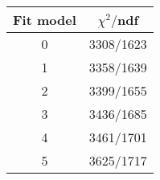 \begin{tabular}{c|c}
Fit model & $\chi^2/$ndf \\
\hline
0 & 3308/1623\\
1 & 3358/1639\\
2 & 3399/1655\\
3 & 3436/1685\\
4 & 3461/1701\\
5 & 3625/1717\\
\end{tabular}
